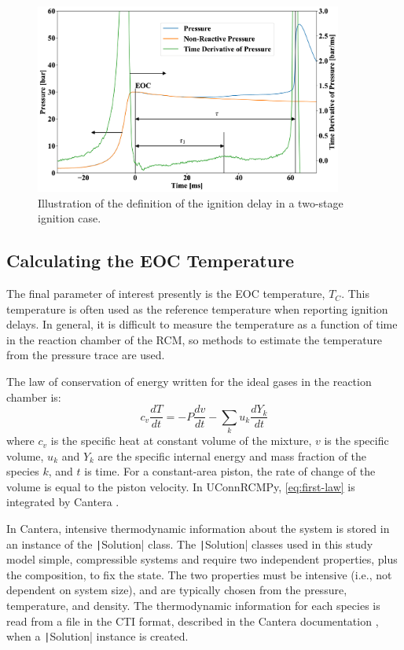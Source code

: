 \documentclass[12pt]{../ussci}
\begin{document}
\begin{figure}[htbp]
\centering
\includegraphics[width=0.9\textwidth]{figures/ign-delay-def.png}
\caption{Illustration of the definition of the ignition delay in a
two-stage ignition case.}
\label{fig:ign-delay-def}
\end{figure}

\subsection{Calculating the EOC Temperature}\label{calculating-the-eoc-temperature}

The final parameter of interest presently is the EOC temperature,
\(T_C\). This temperature is often used as the reference temperature
when reporting ignition delays. In general, it is difficult to measure
the temperature as a function of time in the reaction chamber of the
RCM, so methods to estimate the temperature from the pressure trace are
used.

The law of conservation of energy written for the ideal gases in the
reaction chamber is:
%
\begin{equation} \label{eq:first-law}
    c_v \frac{dT}{dt} = -P \frac{dv}{dt} - \sum_k u_k \frac{d Y_k}{dt}
\end{equation}
%
where \(c_v\) is the specific heat at constant volume of the mixture,
\(v\) is the specific volume, \(u_k\) and \(Y_k\) are the specific
internal energy and mass fraction of the species \(k\), and \(t\) is
time. For a constant-area piston, the rate of change of the volume is
equal to the piston velocity. In UConnRCMPy, \cref{eq:first-law} is
integrated by Cantera \autocite{cantera}.

In Cantera, intensive thermodynamic information about the system is
stored in an instance of the \texttt|Solution| class. The
\texttt|Solution| classes used in this study model simple, compressible
systems and require two independent properties, plus the composition, to
fix the state. The two properties must be intensive (i.e., not dependent
on system size), and are typically chosen from the pressure,
temperature, and density. The thermodynamic information for each species
is read from a file in the CTI format, described in the Cantera
documentation \autocite{cantera}, when a \texttt|Solution| instance is
created.
\end{document}

